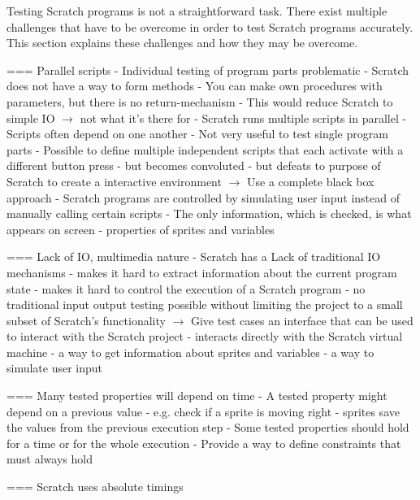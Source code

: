 Testing Scratch programs is not a straightforward task.
There exist multiple challenges that have to be overcome in order to test Scratch programs accurately.
This section explains these challenges and how they may be overcome.


=== Parallel scripts
- Individual testing of program parts problematic
    - Scratch does not have a way to form methods
        - You can make own procedures with parameters, but there is no return-mechanism
        - This would reduce Scratch to simple IO $\rightarrow$ not what it's there for
    - Scratch runs multiple scripts in parallel
        - Scripts often depend on one another
    - Not very useful to test single program parts
    - Possible to define multiple independent scripts that each activate with a different button press
        - but becomes convoluted
        - but defeats to purpose of Scratch to create a interactive environment
$\rightarrow$ Use a complete black box approach
    - Scratch programs are controlled by simulating user input instead of manually calling certain scripts
    - The only information, which is checked, is what appears on screen
        - properties of sprites and variables

=== Lack of IO, multimedia nature
- Scratch has a Lack of traditional IO mechanisms
    - makes it hard to extract information about the current program state
    - makes it hard to control the execution of a Scratch program
    - no traditional input output testing possible without limiting the project to a small subset of Scratch's functionality
$\rightarrow$ Give test cases an interface that can be used to interact with the Scratch project
    - interacts directly with the Scratch virtual machine
    - a way to get information about sprites and variables
    - a way to simulate user input

=== Many tested properties will depend on time
- A tested property might depend on a previous value
    - e.g. check if a sprite is moving right
    - sprites save the values from the previous execution step
- Some tested properties should hold for a time or for the whole execution
    - Provide a way to define constraints that must always hold

=== Scratch uses absolute timings

